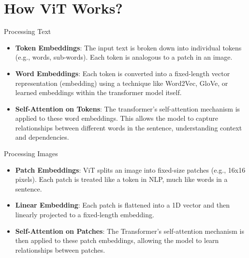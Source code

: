 \section{How ViT Works?}

\begin{frame}{Processing Text}
    \begin{itemize}
        \item \textbf{Token Embeddings}: The input text is broken down into individual tokens (e.g., words, sub-words). Each token is analogous to a patch in an image.
	    \item \textbf{Word Embeddings}: Each token is converted into a fixed-length vector representation (embedding) using a technique like Word2Vec, GloVe, or learned embeddings within the transformer model itself.
	    \item \textbf{Self-Attention on Tokens}: The transformer's self-attention mechanism is applied to these word embeddings. This allows the model to capture relationships between different words in the sentence, understanding context and dependencies.
    \end{itemize}
\end{frame}

\begin{frame}{Processing Images}
    \begin{itemize}
        \item \textbf{Patch Embeddings}: ViT splits an image into fixed-size patches (e.g., 16x16 pixels). Each patch is treated like a token in NLP, much like words in a sentence.
	    \item \textbf{Linear Embedding}: Each patch is flattened into a 1D vector and then linearly projected to a fixed-length embedding.
	    \item \textbf{Self-Attention on Patches}: The Transformer’s self-attention mechanism is then applied to these patch embeddings, allowing the model to learn relationships between patches.
    \end{itemize}
\end{frame}

